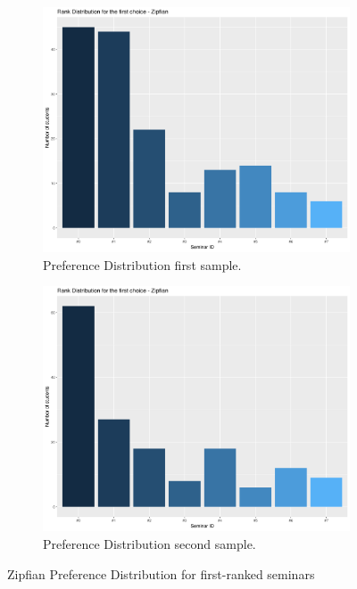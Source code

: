 \begin{figure}[h!]
    \centering
    \begin{subfigure}[b]{0.49\linewidth}
      \includegraphics[width=\linewidth]{assets/plots/zipfian1-distribution.png}
      \caption{Preference Distribution first sample.}
    \end{subfigure}
    \begin{subfigure}[b]{0.49\linewidth}
      \includegraphics[width=\linewidth]{assets/plots/zipfian2-distribution.png}
      \caption{Preference Distribution second sample.}
    \end{subfigure}
    \caption{Zipfian Preference Distribution for first-ranked seminars}
    \label{fig:zipfian-distribution}
  \end{figure}

